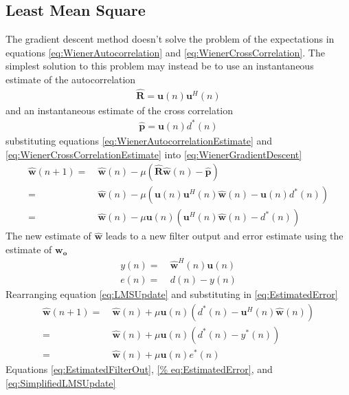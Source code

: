 \subsection{Least Mean Square}
\label{sec:LMS}
The gradient descent method doesn't solve the problem of %
the expectations in equations \ref{eq:WienerAutocorrelation} %
and \ref{eq:WienerCrossCorrelation}. The simplest solution %
to this problem may instead be to use an instantaneous %
estimate of the autocorrelation
\begin{align}
	\hat{\mathbf{R}} = \mathbf{u}(n)\mathbf{u}^{H}(n)
	\label{eq:WienerAutocorrelationEstimate}
\end{align}
and an instantaneous estimate of the cross correlation
\begin{align}
	\hat{\mathbf{p}} = \mathbf{u}(n)d^{*}(n)
	\label{eq:WienerCrossCorrelationEstimate}
\end{align}
substituting equations \ref{eq:WienerAutocorrelationEstimate} %
and \ref{eq:WienerCrossCorrelationEstimate} into %
\ref{eq:WienerGradientDescent}
\begin{align}
	\hat{\mathbf{w}}(n+1) =&~\hat{\mathbf{w}}(n)-\mu(
	\hat{\mathbf{R}}\hat{\mathbf{w}}(n) - \hat{
	\mathbf{p}})\\
	=&~\hat{\mathbf{w}}(n) - \mu(\mathbf{u}(n)
	\mathbf{u}^{H}(n)\hat{\mathbf{w}}(n) - 
	\mathbf{u}(n)d^{*}(n))\\
	=&~\hat{\mathbf{w}}(n) - \mu\mathbf{u}(n)(
	\mathbf{u}^{H}(n)\hat{\mathbf{w}}(n) - d^{*}
	(n))
	\label{eq:LMSUpdate}
\end{align}
The new estimate of $\hat{\mathbf{w}}$ leads %
to a new filter output and error estimate %
using the estimate of $\mathbf{w_{o}}$ 
\begin{align}
	y(n) =&~\hat{\mathbf{w}}^{H}(n)\mathbf{u}(n)
	\label{eq:EstimatedFilterOut}\\
	e(n) =&~d(n) - y(n)
	\label{eq:EstimatedError}
\end{align}
Rearranging equation \ref{eq:LMSUpdate} and substituting %
in \ref{eq:EstimatedError}
\begin{align}
	\hat{\mathbf{w}}(n+1) =&~\hat{\mathbf{w}}(n) + 
	\mu\mathbf{u}(n)\left(d^{*}(n) - \mathbf{u}^{H}
	(n)\hat{\mathbf{w}}(n)\right)\\
	=&~\hat{\mathbf{w}}(n) + \mu\mathbf{u}(n)\left(
	d^{*}(n) - y^{*}(n)\right)\\
	=&~\hat{\mathbf{w}}(n) + \mu\mathbf{u}(n)e^{*}(n)
	\label{eq:SimplifiedLMSUpdate}
\end{align}
Equations \ref{eq:EstimatedFilterOut}, \ref{%
eq:EstimatedError}, and \ref{eq:SimplifiedLMSUpdate} %
